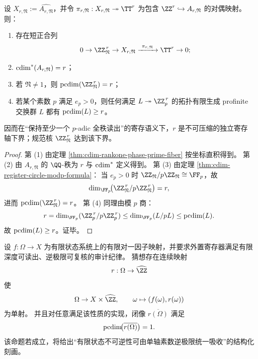 \begin{theorem}[高秩局部化的环面相位与寄存轴最小秩]\label{thm:cdim-highrank-phase-register-minimality}
设 \(X_{r,\mathfrak N}:=\widehat{A_{r,\mathfrak N}}\)，并令 \(\pi_{r,\mathfrak N}:X_{r,\mathfrak N}\twoheadrightarrow\TT^r\) 为包含 \(\ZZ^r\hookrightarrow A_{r,\mathfrak N}\) 的对偶映射。
则：
\begin{enumerate}
  \item 存在短正合列
  \[
  0\to \ZZ_{\mathfrak N}^{\,r}\to X_{r,\mathfrak N}\xrightarrow{\ \pi_{r,\mathfrak N}\ }\TT^r\to 0;
  \]
  \item \(\operatorname{cdim}^\ast(A_{r,\mathfrak N})=r\)；
  \item 若 \(\mathfrak N\neq 1\)，则 \(\pcdim(\ZZ_{\mathfrak N}^{\,r})=r\)；
  \item 若某个素数 \(p\) 满足 \(e_p>0\)，则任何满足 \(L\twoheadrightarrow \ZZ_p^{\,r}\) 的拓扑有限生成 profinite 交换群 \(L\) 都有 \(\operatorname{pcdim}(L)\ge r\)。
\end{enumerate}
因而在“保持至少一个 \(p\)-adic 全秩读出”的寄存语义下，\(r\) 是不可压缩的独立寄存轴下界；规范核 \(\ZZ_{\mathfrak N}^{\,r}\) 达到该下界。
\end{theorem}
\begin{proof}
第 (1) 由定理 \ref{thm:cdim-rankone-phase-prime-fiber} 按坐标直积得到。
第 (2) 由 \(A_{r,\mathfrak N}\) 的 \(\QQ\)-秩为 \(r\) 与 \(\operatorname{cdim}^\ast\) 定义得到。
第 (3) 由定理 \ref{thm:cdim-register-circle-modp-formula}：
当 \(e_p>0\) 时 \(\ZZ_{\mathfrak N}/p\ZZ_{\mathfrak N}\cong\FF_p\)，故
\[
\dim_{\FF_p}\!\bigl(\ZZ_{\mathfrak N}^{\,r}/p\ZZ_{\mathfrak N}^{\,r}\bigr)=r,
\]
进而 \(\pcdim(\ZZ_{\mathfrak N}^{\,r})=r\)。
第 (4) 同理由模 \(p\) 商：
\[
r=\dim_{\FF_p}(\ZZ_p^{\,r}/p\ZZ_p^{\,r})
\le
\dim_{\FF_p}(L/pL)
\le
\pcdim(L).
\]
故 \(\operatorname{pcdim}(L)\ge r\)。证毕。
\end{proof}

\begin{conjecture}[有限状态折叠的一轴素数寄存普适性]\label{conj:cdim-one-axis-prime-register-universality}
设 \(f:\Omega\to X\) 为有限状态系统上的有限对一因子映射，并要求外置寄存器满足有限深度可读出、逆极限可复核的审计纪律。
猜想存在连续映射
\[
r:\Omega\to\widehat{\ZZ}
\]
使
\[
\Omega\to X\times\widehat{\ZZ},
\qquad
\omega\mapsto (f(\omega),r(\omega))
\]
为单射。
并且对任意满足该性质的实现，闭像 \(\overline{r(\Omega)}\) 满足
\[
\operatorname{pcdim}\!\bigl(\overline{r(\Omega)}\bigr)=1.
\]
该命题若成立，将给出“有限状态不可逆性可由单轴素数逆极限统一吸收”的结构化刻画。
\end{conjecture}

\endinput
